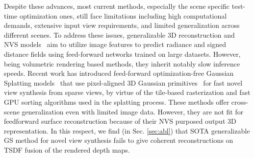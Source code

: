 Despite these advances, most current methods, especially the scene specific test-time optimization ones, still face limitations including high computational demands,  extensive input view requirements, and limited generalization across different scenes. To address these issues, generalizable 3D reconstruction and NVS models~\cite{johari2022geonerf, xu2023wavenerf, chen2021mvsnerf, ren2023volrecon, long2022sparseneus, liang2024retr, jena2024geotransfer, na2024uforecon} aim to utilize image features to predict radiance and signed distance fields using feed-forward networks trained on large datasets. However, being volumetric rendering based methods, they inherit notably slow inference speeds. Recent work has introduced feed-forward optimization-free Gaussian Splatting models~\cite{liu2024fast, chen2024mvsplat, charatan2024pixelsplat, szymanowicz2024splatter, zheng2024gps} that use pixel-aligned 3D Gaussian primitives~\cite{kerbl20233d} for fast novel view synthesis from sparse views, by virtue of the tile-based rasterization and fast GPU sorting algorithms used in the splatting process. These methods offer cross-scene generalization even with limited image data. However, they are not fit for feedforward surface reconstruction because of their NVS purposed output 3D representation. In this respect, we find (in Sec. \ref{sec:abl}) that SOTA generalizable GS method \cite{liu2024fast} for novel view synthesis fails to give coherent reconstructions on TSDF fusion of the rendered depth maps.  



